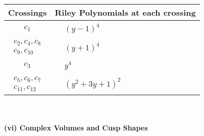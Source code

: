 \documentclass[1p]{elsarticle_modified}
\theoremstyle{definition}
\begin{document}
\begin{tabular}{m{50pt}|m{274pt}}
Crossings & \hspace{64pt}Riley Polynomials at each crossing \\
\hline $$\begin{aligned}c_{1}\end{aligned}$$&$\begin{aligned}
&(y-1)^4
\end{aligned}$\\
\hline $$\begin{aligned}c_{2},c_{4},c_{8}\\c_{9},c_{10}\end{aligned}$$&$\begin{aligned}
&(y+1)^4
\end{aligned}$\\
\hline $$\begin{aligned}c_{3}\end{aligned}$$&$\begin{aligned}
&y^4
\end{aligned}$\\
\hline $$\begin{aligned}c_{5},c_{6},c_{7}\\c_{11},c_{12}\end{aligned}$$&$\begin{aligned}
&(y^2+3 y+1)^2
\end{aligned}$\\
\hline
\end{tabular}\\~\\
\newpage\flushleft \textbf{(vi) Complex Volumes and Cusp Shapes}
\end{document}
